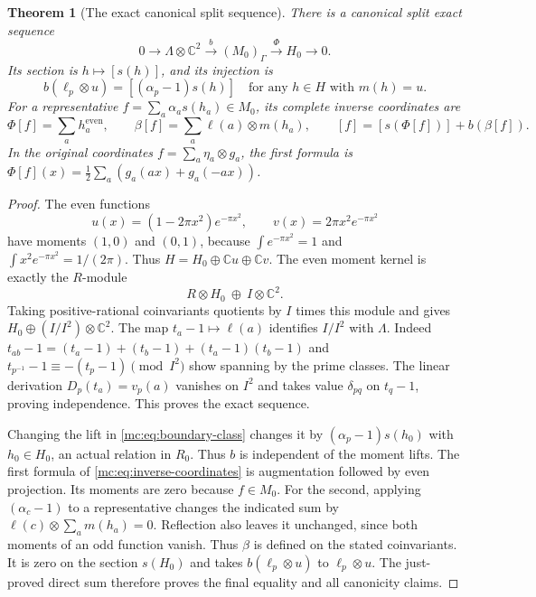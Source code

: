 \documentclass[11pt,a4paper]{article}
\newtheorem{theorem}{Theorem}[section]
\theoremstyle{definition}\newtheorem{definition}[theorem]{Definition}
\newcommand{\C}{\mathbb C}\newcommand{\R}{\mathbb R}
\begin{document}
\begin{theorem}[The exact canonical split sequence]
\label{mc:thm:coinvariants}
There is a canonical split exact sequence
\[
 0\longrightarrow\Lambda\otimes\C^2
 \xrightarrow{b}(M_0)_\Gamma
 \xrightarrow{\Phi}H_0\longrightarrow0.
 \tag{MC5}\label{mc:eq:coinvariant-sequence}
\]
Its section is $h\mapsto[s(h)]$, and its injection is
\[
 b(\ell_p\otimes u)=[(\alpha_p-1)s(h)]
 \quad\text{for any }h\in H\text{ with }m(h)=u.
 \tag{MC6}\label{mc:eq:boundary-class}
\]
For a representative $f=\sum_a\alpha_as(h_a)\in M_0$, its
complete inverse coordinates are
\[
 \Phi[f]=\sum_a h_a^{\mathrm{even}},\qquad
 \beta[f]=\sum_a\ell(a)\otimes m(h_a),
 \qquad
 [f]=[s(\Phi[f])]+b(\beta[f]).
 \tag{MC7}\label{mc:eq:inverse-coordinates}
\]
In the original coordinates $f=\sum_a\eta_a\otimes g_a$,
the first formula is
$\Phi[f](x)=\tfrac12\sum_a(g_a(ax)+g_a(-ax))$.
\end{theorem}
\begin{proof}
The even functions
\[
 u(x)=(1-2\pi x^2)e^{-\pi x^2},\qquad
 v(x)=2\pi x^2e^{-\pi x^2}
 \tag{MC8}\label{mc:eq:moment-lifts}
\]
have moments $(1,0)$ and $(0,1)$, because
$\int e^{-\pi x^2}=1$ and $\int x^2e^{-\pi x^2}=1/(2\pi)$.
Thus $H=H_0\oplus\C u\oplus\C v$. The even moment kernel is
exactly the $R$-module
\[
 R\otimes H_0\ \oplus\ I\otimes\C^2.
 \tag{MC9}\label{mc:eq:moment-module}
\]
Taking positive-rational coinvariants quotients by $I$ times this
module and gives $H_0\oplus(I/I^2)\otimes\C^2$.
The map $t_a-1\mapsto\ell(a)$ identifies $I/I^2$ with
$\Lambda$. Indeed
$t_{ab}-1=(t_a-1)+(t_b-1)+(t_a-1)(t_b-1)$ and
$t_{p^{-1}}-1\equiv-(t_p-1)\pmod{I^2}$ show spanning by
the prime classes. The linear derivation $D_p(t_a)=v_p(a)$
vanishes on $I^2$ and takes value $\delta_{pq}$ on $t_q-1$,
proving independence. This proves the exact sequence.

Changing the lift in \eqref{mc:eq:boundary-class} changes it by
$(\alpha_p-1)s(h_0)$ with $h_0\in H_0$, an actual relation in
$R_0$. Thus $b$ is independent of the moment lifts.
The first formula of \eqref{mc:eq:inverse-coordinates} is augmentation
followed by even projection. Its moments are zero because $f\in M_0$.
For the second, applying $(\alpha_c-1)$ to a representative changes
the indicated sum by
$\ell(c)\otimes\sum_am(h_a)=0$. Reflection also leaves it
unchanged, since both moments of an odd function vanish. Thus
$\beta$ is defined on the stated coinvariants. It is zero on the
section $s(H_0)$ and takes $b(\ell_p\otimes u)$ to
$\ell_p\otimes u$. The just-proved direct sum therefore proves
the final equality and all canonicity claims.
\end{proof}
\end{document}
